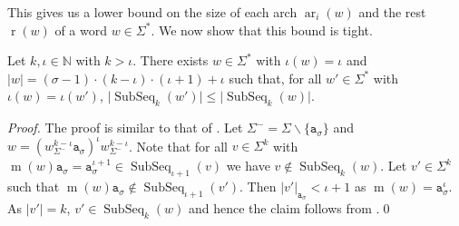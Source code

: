 \documentclass[runningheads,UKenglish,cleveref, autoref, thm-restate]{llncs}
\newcommand{\N}{\mathbb{N}}
\def\ta{\mathtt{a}}
\def\r{\operatorname{r}}
\def\m{\operatorname{m}}
\DeclareMathOperator{\arch}{ar}
\DeclareMathOperator\ScatFact{SubSeq}
\DeclareMathOperator{\Univ}{Univ}
\newif\ifpaper
\begin{document}
\ifpaper
\else
This gives us a lower bound on the size of each arch $\arch_i(w)$ and the rest $\r(w)$ of a word $w\in\Sigma^*$. We now show that this bound is tight.
\fi


\ifpaper
\else
\begin{lemma}\label{lemma:min-absent-shortest-upper-bound}
    Let $k, \iota\in \N$ with $k > \iota$. There exists $w\in\Sigma^*$ with $\iota(w)=\iota$ and $\vert w \vert = (\sigma-1)\cdot(k-\iota)\cdot(\iota+1)+\iota$ such that, for all 
    $w'\in\Sigma^*$ with $\iota(w)  = \iota(w')$, $\vert\ScatFact_k(w')\vert \leq \vert\ScatFact_k(w)\vert$.
\end{lemma}

\begin{proof}
	The proof is similar to that of .
	Let $\Sigma^-=\Sigma\backslash\{\ta_{\sigma}\}$ and $w = (w_{\Sigma^-}^{k-\iota} \ta_\sigma)^{\iota}w_{\Sigma^-}^{k-\iota}$.
	Note that for all $v\in\Sigma^k$ with $\m(w)\ta_\sigma = \ta_{\sigma}^{\iota+1} \in \ScatFact_{\iota+1}(v)$ we have $v \notin \ScatFact_k(w)$. Let $v'\in\Sigma^k$ such that  $\m(w)\ta_\sigma \notin \ScatFact_{\iota+1}(v')$. Then $\vert v'\vert_{\ta_\sigma} < \iota + 1$ as $\m(w) = \ta_{\sigma}^{\iota}$.
	As $\vert v' \vert = k$, $v'\in\ScatFact_k(w)$ and hence the claim follows from .\qed
\end{proof}
\fi


\end{document}
